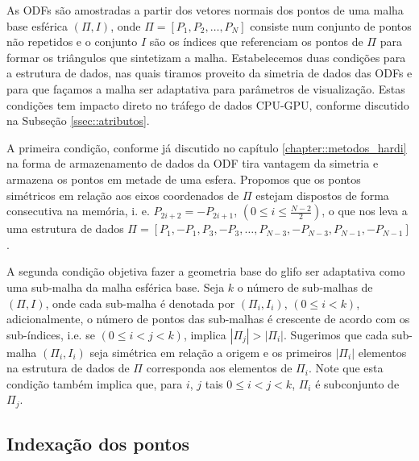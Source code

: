 
As ODFs são amostradas a partir dos vetores normais dos pontos de uma malha base esférica $(\Pi, I)$, onde $\Pi = [P_1, P_2, \dots, P_N]$ consiste num conjunto de pontos não repetidos e o conjunto $I$ são os índices que referenciam os pontos de $\Pi$ para formar os triângulos que sintetizam a malha. Estabelecemos duas condições para a estrutura de dados, nas quais tiramos proveito da simetria de dados das ODFs e para que façamos a malha ser adaptativa para parâmetros de visualização. Estas condições tem impacto direto no tráfego de dados CPU-GPU, conforme discutido na Subseção \ref{ssec::atributos}.

A primeira condição, conforme já discutido no capítulo \ref{chapter::metodos_hardi} na forma de armazenamento de dados da ODF tira vantagem da simetria e armazena os pontos em metade de uma esfera. Propomos que os pontos simétricos em relação aos eixos coordenados de $\Pi$ estejam dispostos de forma consecutiva na memória, i. e. $P_{2i+2} = -P_{2i+1}$, $(0 \leq i \leq \frac{N-2}{2})$, o que nos leva a uma estrutura de dados $\Pi = [P_1, -P_1, P_3, -P_3, \dots, P_{N-3}, -P_{N-3}, P_{N-1}, -P_{N-1}]$.

A segunda condição objetiva fazer a geometria base do glifo ser adaptativa como uma sub-malha da malha esférica base. Seja $k$ o número de sub-malhas de $(\Pi, I)$, onde cada sub-malha é denotada por $(\Pi_i, I_i)$,  $(0 \leq i < k)$, adicionalmente, o número de pontos das sub-malhas é crescente de acordo com os sub-índices, i.e. se $(0 \leq i < j < k)$, implica $|\Pi_j| > |\Pi_i|$. Sugerimos que cada sub-malha $(\Pi_i, I_i)$ seja simétrica em relação a origem e os primeiros $|\Pi_i|$ elementos na estrutura de dados de $\Pi$ corresponda aos elementos de $\Pi_i$. Note que esta condição também implica que, para $i$, $j$ tais $0 \leq i < j < k$, $\Pi_i$ é subconjunto de $\Pi_j$.

\subsection{Indexação dos pontos}
\label{sssec::formulação_da_geometria_e_estruturação_de_dados}

